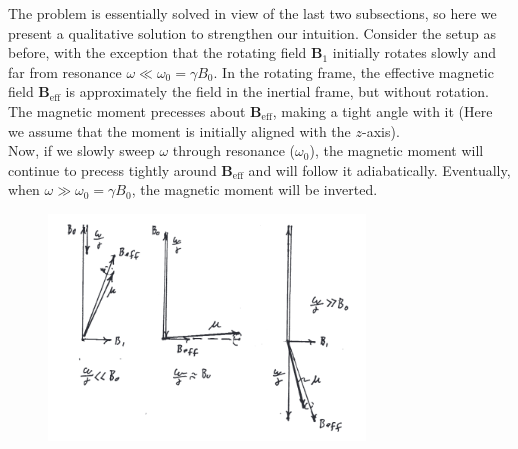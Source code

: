 \documentclass{book}
\theoremstyle{definition}
\begin{document}
The problem is essentially solved in view of the last two subsections, so here we present a qualitative solution to strengthen our intuition. Consider the setup as before, with the exception that the rotating field $\bm{B}_1$ initially rotates slowly and far from resonance $\omega \ll \omega_0 = \gamma B_0$. In the rotating frame, the effective magnetic field $\bm{B}_\text{eff}$ is approximately the field in the inertial frame, but without rotation. The magnetic moment precesses about $\bm{B}_\text{eff}$, making a tight angle with it (Here we assume that the moment is initially aligned with the $z$-axis). \\

Now, if we slowly sweep $\omega$ through resonance ($\omega_0$), the magnetic moment will continue to precess tightly around $\bm{B}_\text{eff}$ and will follow it adiabatically.  Eventually, when $\omega \gg \omega_0  = \gamma B_0$, the magnetic moment will be inverted. 


\begin{figure}[!htb]
	\centering
	\includegraphics[width=0.75\textwidth]{figures/LZ_following}
\end{figure}
\end{document}
